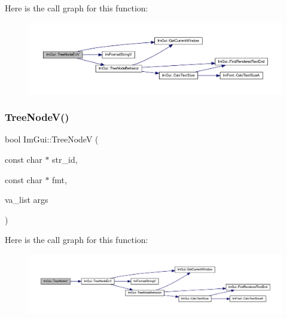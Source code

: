 Here is the call graph for this function\+:
\nopagebreak
\begin{figure}[H]
\begin{center}
\leavevmode
\includegraphics[width=350pt]{namespace_im_gui_aaae827898572d17e064a88a1afc8e6b0_cgraph}
\end{center}
\end{figure}
\mbox{\label{namespace_im_gui_a9bc1075c583973d76d8d65ea89787453}} 
\subsubsection{\texorpdfstring{Tree\+Node\+V()}{TreeNodeV()}\hspace{0.1cm}{\footnotesize\ttfamily [1/2]}}
{\footnotesize\ttfamily bool Im\+Gui\+::\+Tree\+NodeV (\begin{DoxyParamCaption}\item[{const char $\ast$}]{str\+\_\+id,  }\item[{const char $\ast$}]{fmt,  }\item[{va\+\_\+list}]{args }\end{DoxyParamCaption})}

Here is the call graph for this function\+:
\nopagebreak
\begin{figure}[H]
\begin{center}
\leavevmode
\includegraphics[width=350pt]{namespace_im_gui_a9bc1075c583973d76d8d65ea89787453_cgraph}
\end{center}
\end{figure}
\mbox{\label{namespace_im_gui_a15320f61ba6b4916af3323bf7844602e}} 
